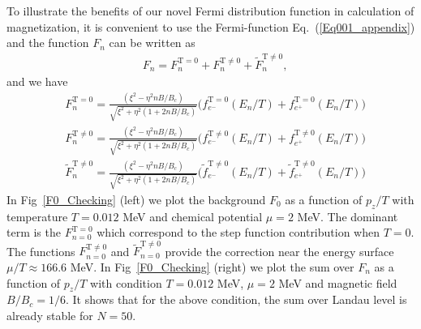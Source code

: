 \documentclass[sn-mathphys,Numbered]{sn-jnl}
\begin{document}
To illustrate the benefits of our novel Fermi distribution function in calculation of magnetization, it is convenient to use the Fermi-function Eq.~(\ref{Eq001_appendix}) and the function $F_n$ can be written as
\begin{align}
&F_n=F_n^{\mathrm{T=0}}+F_n^{\mathrm{T\neq0}}+\widetilde F_n^{\mathrm{T\neq0}},
\end{align}
and we have
\begin{align}
&F_n^{\mathrm{T=0}}=\frac{(\xi^2-\eta^2nB/B_c)}{\sqrt{\xi^2+\eta^2\left(1+2nB/B_c\right)}}\bigg(f^{\mathrm{T=0}}_{e^-}(E_n/T)+f^{\mathrm{T=0}}_{e^+}(E_n/T)\bigg)\\
&F_n^{\mathrm{T\neq0}}=\frac{(\xi^2-\eta^2nB/B_c)}{\sqrt{\xi^2+\eta^2\left(1+2nB/B_c\right)}}\bigg(f^{\mathrm{T\neq0}}_{e^-}(E_n/T)+f^{\mathrm{T\neq0}}_{e^+}(E_n/T)\bigg)\\
&\widetilde F_n^{\mathrm{T\neq0}}=\frac{(\xi^2-\eta^2nB/B_c)}{\sqrt{\xi^2+\eta^2\left(1+2nB/B_c\right)}}\bigg(\tilde f^{\mathrm{T\ne0}}_{e^-}(E_n/T)+\tilde f^{\mathrm{T\neq0}}_{e^+}(E_n/T)\bigg)
\end{align}
In Fig~\ref{F0_Checking} (left) we plot the background  $F_0$ as a function of $p_z/T$ with temperature $T=0.012$ MeV and chemical potential $\mu=2$ MeV. The dominant term is the $F_{n=0}^{\mathrm{T=0}}$ which correspond to the step function contribution when $T=0$. The functions $F_{n=0}^{\mathrm{T\neq0}}$ and $\widetilde F_{n=0}^{\mathrm{T\neq0}}$ provide the correction near the energy surface $\mu/T\approx166.6$ MeV. In Fig~\ref{F0_Checking} (right) we plot the sum over $F_n$ as a function of $p_z/T$ with condition $T=0.012$ MeV, $\mu=2$ MeV and magnetic field $B/B_c=1/6$. It shows that for the above condition, the sum over Landau level is already stable for $N=50$.
\end{document}
